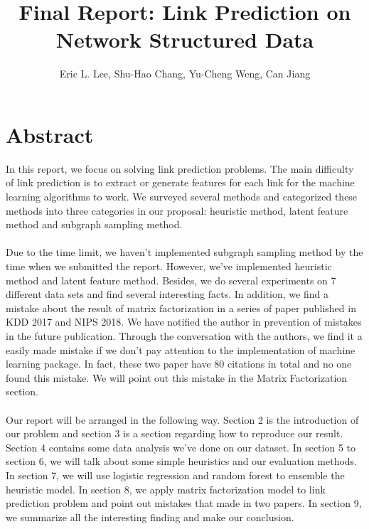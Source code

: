 \documentclass[12pt]{article}
\begin{document}
 
\title{Final Report: Link Prediction on Network Structured Data}
\author{Eric L. Lee, Shu-Hao Chang, Yu-Cheng Weng, Can Jiang} 
\maketitle

\section{Abstract}

In this report, we focus on solving link prediction problems. The main difficulty of link prediction is to extract or generate features for each link for the machine learning algorithms to work. We surveyed several methods and categorized these methods into three categories in our proposal: heuristic method, latent feature method and subgraph sampling method.
\\ \\
Due to the time limit, we haven't implemented subgraph sampling method by the time when we submitted the report. However, we've implemented heuristic method and latent feature method. Besides, we do several experiments on 7 different data sets and find several interesting facts. In addition, we find a mistake about the result of matrix factorization in a series of paper published in KDD 2017 and NIPS 2018. We have notified the author in prevention of mistakes in the future publication. Through the conversation with the authors, we find it a easily made mistake if we don't pay attention to the implementation of machine learning package. In fact, these two paper have 80 citations in total and no one found this mistake. We will point out this mistake in the Matrix Factorization section.
\\ \\
Our report will be arranged in the following way. Section 2 is the introduction of our problem and section 3 is a section regarding how to reproduce our result. Section 4 contains some data analysis we've done on our dataset. In section 5 to section 6, we will talk about some simple heuristics and our evaluation methods. In section 7, we will use logistic regression and random forest to ensemble the heuristic model. In section 8, we apply matrix factorization model to link prediction problem and point out mistakes that made in two papers. In section 9, we summarize all the interesting finding and make our conclusion.
\end{document}
